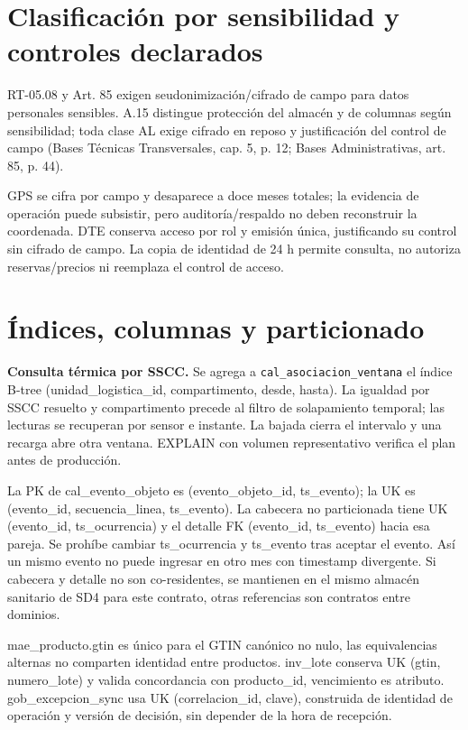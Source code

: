 \section{Clasificación por sensibilidad y controles declarados}
\label{anexo-5e}

RT-05.08 y Art. 85 exigen seudonimización/cifrado de campo para datos personales sensibles. A.15 distingue protección del almacén y de columnas según sensibilidad; toda clase AL exige cifrado en reposo y justificación del control de campo (Bases Técnicas Transversales, cap. 5, p. 12; Bases Administrativas, art. 85, p. 44).


GPS se cifra por campo y desaparece a doce meses totales; la evidencia de operación puede subsistir, pero auditoría/respaldo no deben reconstruir la coordenada. DTE conserva acceso por rol y emisión única, justificando su control sin cifrado de campo. La copia de identidad de 24 h permite consulta, no autoriza reservas/precios ni reemplaza el control de acceso.

\section{Índices, columnas y particionado}
\label{anexo-5f}

\textbf{Consulta térmica por SSCC.} Se agrega a \texttt{cal\_\allowbreak{}asociacion\_\allowbreak{}ventana} el índice B-tree (unidad\_logistica\_id, compartimento, desde, hasta). La igualdad por SSCC resuelto y compartimento precede al filtro de solapamiento temporal; las lecturas se recuperan por sensor e instante. La bajada cierra el intervalo y una recarga abre otra ventana. EXPLAIN con volumen representativo verifica el plan antes de producción.

La PK de cal\_evento\_objeto es (evento\_objeto\_id, ts\_evento); la UK es (evento\_id, secuencia\_linea, ts\_evento). La cabecera no particionada tiene UK (evento\_id, ts\_ocurrencia) y el detalle FK (evento\_id, ts\_evento) hacia esa pareja. Se prohíbe cambiar ts\_ocurrencia y ts\_evento tras aceptar el evento. Así un mismo evento no puede ingresar en otro mes con timestamp divergente. Si cabecera y detalle no son co-residentes, se mantienen en el mismo almacén sanitario de SD4 para este contrato, otras referencias son contratos entre dominios.

mae\_producto.gtin es único para el GTIN canónico no nulo, las equivalencias alternas no comparten identidad entre productos. inv\_lote conserva UK (gtin, numero\_lote) y valida concordancia con producto\_id, vencimiento es atributo. gob\_excepcion\_sync usa UK (correlacion\_id, clave), construida de identidad de operación y versión de decisión, sin depender de la hora de recepción.

